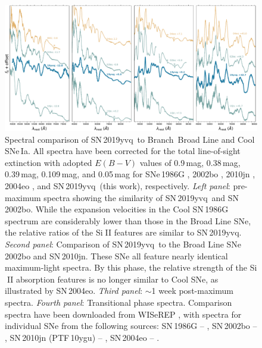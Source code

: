 \documentclass[twocolumn]{aastex63}
\def\ion#1#2{#1$\;${\footnotesize\rm{#2}}\relax}
\newcommand{\sn}{SN\,2019yvq}
\begin{document}

\begin{figure}
    \centering
    \includegraphics[width=\textwidth]{./figures/spec_comp_extinction.pdf}
    \caption{Spectral comparison of \sn\ to Branch~Broad Line
    and Cool SNe\,Ia. All spectra have been corrected for the total
    line-of-sight extinction with adopted $E(B-V)$ values of 0.9\,mag,
    0.38\,mag, 0.39\,mag, 0.109\,mag, and 0.05\,mag for SNe\,1986G
    \citep{Phillips87}, 2002bo \citep{Stehle05}, 2010jn \citep{Hachinger13},
    2004eo \citep{Pastorello07}, and \sn\ (this work), respectively.
    \textit{Left panel}: pre-maximum spectra showing the similarity of \sn\
    and SN\,2002bo. While the expansion velocities in the Cool SN\,1986G
    spectrum are considerably lower than those in the Broad Line SNe, the
    relative ratios of the \ion{Si}{II} features are similar to \sn.
    \textit{Second panel}: Comparison of \sn\ to the Broad Line SNe\,2002bo
    and SN\,2010jn. These SNe all feature nearly identical maximum-light
    spectra. By this phase, the relative strength of the \ion{Si}{II}
    absorption features is no longer similar to \citet{Branch06} Cool SNe, as
    illustrated by SN\,2004eo. \textit{Third panel}: $\sim$1 week post-maximum
    spectra. \textit{Fourth panel}: Transitional phase spectra. Comparison
    spectra have been downloaded from WISeREP \citep{Yaron12}, with spectra
    for individual SNe from the following sources: SN\,1986G --
    \citet{Cristiani92}, SN\,2002bo -- \citet{Benetti04,Silverman11},
    SN\,2010jn (PTF\,10ygu) -- \citet{Hachinger13,Maguire14}, SN\,2004eo --
    \citet{Pastorello07}.}
    \label{fig:spec_comp}
\end{figure}
\end{document}
